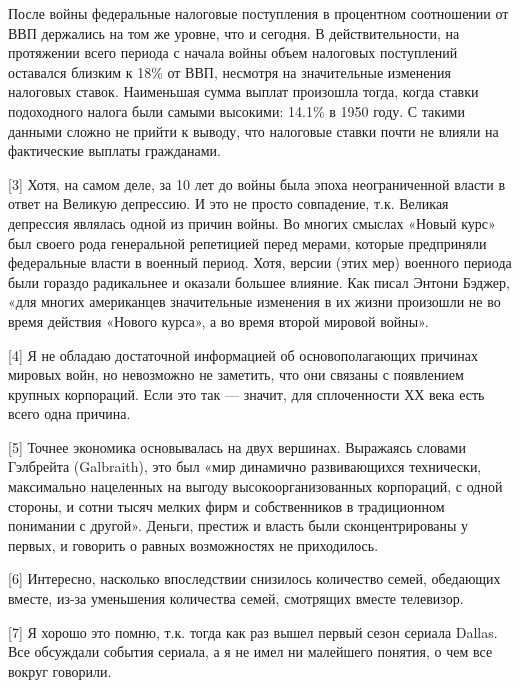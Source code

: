 \documentclass[ebook,12pt,oneside,openany]{memoir}
\begin{document}
После войны федеральные налоговые поступления в процентном соотношении
от ВВП держались на том же уровне, что и сегодня. В действительности,
на протяжении всего периода с начала войны объем налоговых поступлений
оставался близким к 18\% от ВВП, несмотря на значительные изменения
налоговых ставок. Наименьшая сумма выплат произошла тогда, когда
ставки подоходного налога были самыми высокими: 14.1\% в 1950 году. С
такими данными сложно не прийти к выводу, что налоговые ставки почти
не влияли на фактические выплаты гражданами. \newline

[3] Хотя, на самом деле, за 10 лет до войны была эпоха неограниченной
власти в ответ на Великую депрессию. И это не просто совпадение, т.к.
Великая депрессия являлась одной из причин войны. Во многих смыслах
«Новый курс» был своего рода генеральной репетицией перед мерами,
которые предприняли федеральные власти в военный период. Хотя, версии
(этих мер) военного периода были гораздо радикальнее и оказали большее
влияние. Как писал Энтони Бэджер, «для многих американцев значительные
изменения в их жизни произошли не во время действия «Нового курса», а
во время второй мировой войны». \newline

[4] Я не обладаю достаточной информацией об основополагающих причинах
мировых войн, но невозможно не заметить, что они связаны с появлением
крупных корпораций. Если это так — значит, для сплоченности ХХ века
есть всего одна причина. \newline

[5] Точнее экономика основывалась на двух вершинах. Выражаясь словами
Гэлбрейта (Galbraith), это был «мир динамично развивающихся
технически, максимально нацеленных на выгоду высокоорганизованных
корпораций, с одной стороны, и сотни тысяч мелких фирм и собственников
в традиционном понимании с другой». Деньги, престиж и власть были
сконцентрированы у первых, и говорить о равных возможностях не
приходилось. \newline

[6] Интересно, насколько впоследствии снизилось количество семей,
обедающих вместе, из-за уменьшения количества семей, смотрящих вместе
телевизор. \newline

[7] Я хорошо это помню, т.к. тогда как раз вышел первый сезон сериала
Dallas. Все обсуждали события сериала, а я не имел ни малейшего
понятия, о чем все вокруг говорили. \newline
\end{document}
